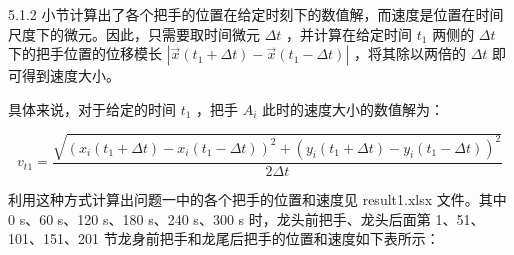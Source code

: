 \documentclass[a4paper]{article}
\begin{document}
		5.1.2 小节计算出了各个把手的位置在给定时刻下的数值解，而速度是位置在时间尺度下的微元。因此，只需要取时间微元 $\Delta t$ ，并计算在给定时间 $t_1$ 两侧的 $\Delta t$ 下的把手位置的位移模长 $|\vec{x}(t_1+\Delta t) - \vec{x}(t_1 - \Delta t)|$ ，将其除以两倍的 $\Delta t$ 即可得到速度大小。



		具体来说，对于给定的时间 $t_1$ ，把手 $A_i$ 此时的速度大小的数值解为：

		\begin{equation}
			v_{t1} = \dfrac{\sqrt{(x_i(t_1 + \Delta t) - x_i(t_1 - \Delta t))^2 + (y_i(t_1 + \Delta t) - y_i(t_1 - \Delta t))^2}}{2\Delta t}
		\end{equation}		

		利用这种方式计算出问题一中的各个把手的位置和速度见 result1.xlsx 文件。其中 0 s、60 s、120 s、180 s、240 s、300 s 时，龙头前把手、龙头后面第 1、51、101、151、201 节龙身前把手和龙尾后把手的位置和速度如下表所示：
\end{document}
